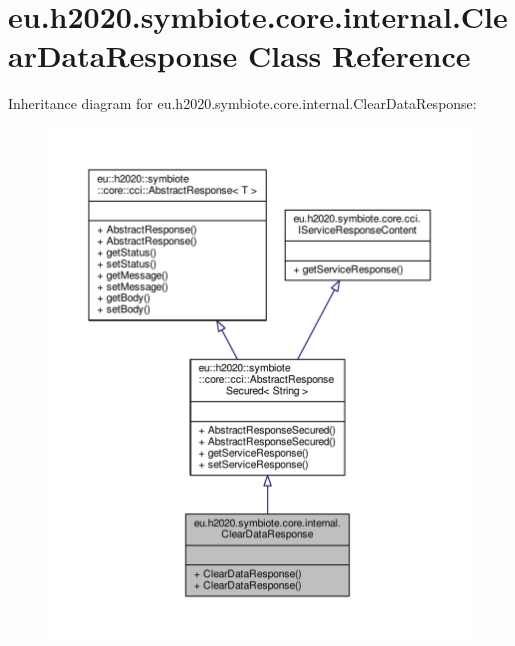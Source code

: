 \hypertarget{classeu_1_1h2020_1_1symbiote_1_1core_1_1internal_1_1ClearDataResponse}{}\section{eu.\+h2020.\+symbiote.\+core.\+internal.\+Clear\+Data\+Response Class Reference}
\label{classeu_1_1h2020_1_1symbiote_1_1core_1_1internal_1_1ClearDataResponse}


Inheritance diagram for eu.\+h2020.\+symbiote.\+core.\+internal.\+Clear\+Data\+Response\+:
\nopagebreak
\begin{figure}[H]
\begin{center}
\leavevmode
\includegraphics[width=350pt]{classeu_1_1h2020_1_1symbiote_1_1core_1_1internal_1_1ClearDataResponse__inherit__graph}
\end{center}
\end{figure}



